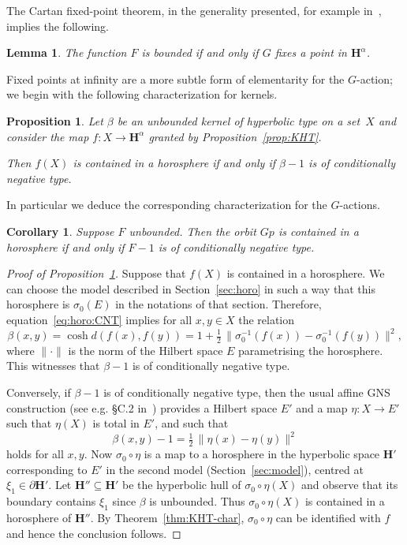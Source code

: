 \documentclass[11pt]{article}
\newtheorem{lem}[theo]{Lemma}
\newtheorem{prop}[theo]{Proposition}
\newtheorem{coro}[theo]{Corollary}
\theoremstyle{definition}
\numberwithin{equation}{section}
\numberwithin{figure}{section}
\numberwithin{table}{section}
\newcommand{\HH}{\mathbf{H}}
\newcommand{\se}{\subseteq}
\newcommand{\inv}{^{-1}}
\begin{document}
The Cartan fixed-point theorem, in the generality presented, for example in~\cite[II.2.8]{Bridson-Haefliger}, implies the following.

\begin{lem}\label{lem:Cartan}
The function $F$ is bounded if and only if $G$ fixes a point in $\HH^\alpha$.
\end{lem}

Fixed points at infinity are a more subtle form of elementarity for the $G$-action; we begin with the following characterization for kernels.

\begin{prop}\label{prop:horo:neg}
Let $\beta$ be an unbounded kernel of hyperbolic type on a set~$X$ and consider the map $f\colon X\to\HH^\alpha$ granted by Proposition~\ref{prop:KHT}.

Then $f(X)$ is contained in a horosphere if and only if $\beta-1$ is of conditionally negative type.
\end{prop}

In particular we deduce the corresponding characterization for the $G$-actions.

\begin{coro}\label{cor:horo:neg}
Suppose $F$ unbounded. Then the orbit $G p$ is contained in a horosphere if and only if $F-1$ is of conditionally negative type.
\end{coro}

\begin{proof}[Proof of Proposition~\ref{prop:horo:neg}]
Suppose that $f(X)$ is contained in a horosphere. We can choose the model described in Section~\ref{sec:horo} in such a way that this horosphere is $\sigma_0(E)$ in the notations of that section. Therefore, equation~\eqref{eq:horo:CNT} implies for all $x,y\in X$ the relation
\[
\beta(x, y) = \cosh d(f(x), f(y)) = 1 + \tfrac 12 \, \big\| \sigma_0\inv (f(x)) - \sigma_0\inv (f(y))\big \|^2,
\]
where $\|\cdot\|$ is the norm of the Hilbert space $E$ parametrising the horosphere. This witnesses that $\beta-1$ is of conditionally negative type.

Conversely, if $\beta-1$ is of conditionally negative type, then the usual affine GNS construction (see e.g. \S C.2 in~\cite{Bekka-Harpe-Valette}) provides a Hilbert space $E'$ and a map $\eta\colon X\to E'$ such that $\eta(X)$ is total in $E'$, and such that
\[
\beta(x,y) -1 = \tfrac 12 \, \| \eta(x) - \eta(y) \|^2
\]
holds for all $x,y$. Now $\sigma_0\circ \eta$ is a map to a horosphere in the hyperbolic space $\HH'$ corresponding to $E'$ in the second model (Section~\ref{sec:model}), centred at $\xi_1\in\partial \HH'$. Let $\HH''\se\HH'$ be the hyperbolic hull of $\sigma_0\circ \eta(X)$ and observe that its boundary contains $\xi_1$ since $\beta$ is unbounded. Thus $\sigma_0\circ \eta(X)$ is contained in a horosphere of $\HH''$. By Theorem~\ref{thm:KHT-char}, $\sigma_0\circ \eta$ can be identified with $f$ and hence the conclusion follows.
\end{proof}
\end{document}
